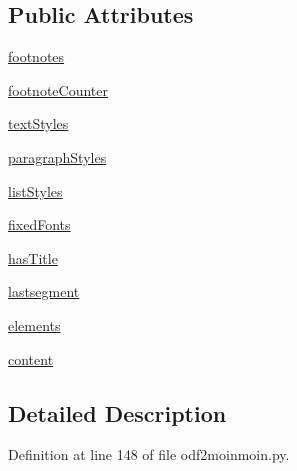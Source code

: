 \subsection*{Public Attributes}
\begin{DoxyCompactItemize}
\item 
\hyperlink{classodf_1_1odf2moinmoin_1_1ODF2MoinMoin_a679a6f7ce2641fc2ec199cade1c8a64f}{footnotes}
\item 
\hyperlink{classodf_1_1odf2moinmoin_1_1ODF2MoinMoin_abddaf84069aef2fd567406d50d44523c}{footnote\+Counter}
\item 
\hyperlink{classodf_1_1odf2moinmoin_1_1ODF2MoinMoin_ac4e15dda5a28e609b5cabf17c5cf0277}{text\+Styles}
\item 
\hyperlink{classodf_1_1odf2moinmoin_1_1ODF2MoinMoin_aca50f432ad6dfe04dc09ff6f035d3c80}{paragraph\+Styles}
\item 
\hyperlink{classodf_1_1odf2moinmoin_1_1ODF2MoinMoin_abfb7e5df411383781a33061548788dff}{list\+Styles}
\item 
\hyperlink{classodf_1_1odf2moinmoin_1_1ODF2MoinMoin_abe115f797787cac002a65db7d292bca2}{fixed\+Fonts}
\item 
\hyperlink{classodf_1_1odf2moinmoin_1_1ODF2MoinMoin_adb4d5f46050418c46fd09e193f37e1e2}{has\+Title}
\item 
\hyperlink{classodf_1_1odf2moinmoin_1_1ODF2MoinMoin_a57071015ea87763672b94b747dcaa468}{lastsegment}
\item 
\hyperlink{classodf_1_1odf2moinmoin_1_1ODF2MoinMoin_a0695b2790b9d410f250a55d2ab06114d}{elements}
\item 
\hyperlink{classodf_1_1odf2moinmoin_1_1ODF2MoinMoin_adeb5ab2aa3dde85bb4b4a545c9246b82}{content}
\end{DoxyCompactItemize}


\subsection{Detailed Description}


Definition at line 148 of file odf2moinmoin.\+py.



